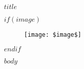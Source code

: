 \documentclass{article}
\begin{document}
  \begin{flushright}
    {$title$}
  \end{flushright}
  $if(image)$
  \begin{figure}[H]
      \centering
      \texttt{[image: \$image\$]}
  \end{figure}
  $endif$
  \begin{flushleft}
    \scriptsize{$body$}
  \end{flushleft}
  \scriptsize
\end{document}

